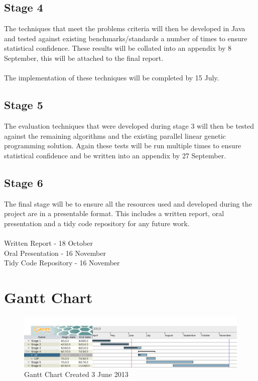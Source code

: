 \subsection{Stage 4} 
The techniques that meet the problems criteria will then be developed in Java and
tested against existing benchmarks/standards a number of times to ensure statistical
confidence. These results will be collated into an appendix by 8 September, this will
be attached to the final report.
\\\\
The implementation of these techniques will be completed by 15 July.

\subsection{Stage 5} 
The evaluation techniques that were developed during stage 3 will then be tested
against the remaining algorithms and the existing parallel linear genetic programming
solution. Again these tests will be run multiple times to ensure statistical confidence
and be written into an appendix by 27 September.



\subsection{Stage 6} 
The final stage will be to ensure all the resources used and developed during the
project are in a presentable format. This includes a written report, oral presentation
and a tidy code repository for any future work.
\\\\
Written Report - 18 October
\\
Oral Presentation - 16 November
\\
Tidy Code Repository - 16 November

\section{Gantt Chart}

\begin{figure}[h]
\includegraphics[width=170mm]{ganttV1.png}
\caption{Gantt Chart Created 3 June 2013}
\end{figure}

